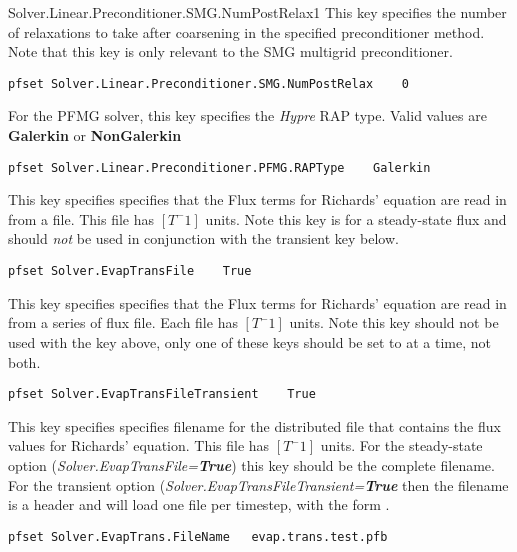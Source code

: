 {Solver.Linear.Preconditioner.SMG.NumPostRelax}{1}
{This key specifies the number of relaxations to take after coarsening in the
specified preconditioner method.  Note that this key is only relevant to
the SMG multigrid preconditioner.
}
\begin{display}\begin{verbatim}
pfset Solver.Linear.Preconditioner.SMG.NumPostRelax    0
\end{verbatim}\end{display}

 {For the
  PFMG solver, this key specifies the {\em Hypre} RAP type.  Valid values
  are {\bf Galerkin} or {\bf NonGalerkin} }
\begin{display}\begin{verbatim}
pfset Solver.Linear.Preconditioner.PFMG.RAPType    Galerkin
\end{verbatim}\end{display}


{This key specifies specifies that the Flux terms for Richards' equation are read in from a  file.  This file has $[T^-1]$
units. Note this key is for a steady-state flux and should \emph{not} be used in conjunction with the transient key below.}
\begin{display}\begin{verbatim}
pfset Solver.EvapTransFile    True
\end{verbatim}\end{display}

{This key specifies specifies that the Flux terms for Richards' equation are read in from a series of flux  file.  Each file has $[T^-1]$
	units. Note this key should not be used with the key above, only one of these keys should be set to  at a time, not both.
}
\begin{display}\begin{verbatim}
pfset Solver.EvapTransFileTransient    True
\end{verbatim}\end{display}


{This key specifies specifies filename for the distributed  file that contains the flux values for Richards' equation.  This file has $[T^-1]$
units.  For the steady-state option (\emph{Solver.EvapTransFile=\bf{True}}) this key should be the complete filename.  For the transient option
(\emph{Solver.EvapTransFileTransient=\bf{True}} then the filename is a header and \parflow{} will load one file per timestep, with the form .}
\begin{display}\begin{verbatim}
pfset Solver.EvapTrans.FileName   evap.trans.test.pfb
\end{verbatim}\end{display}

